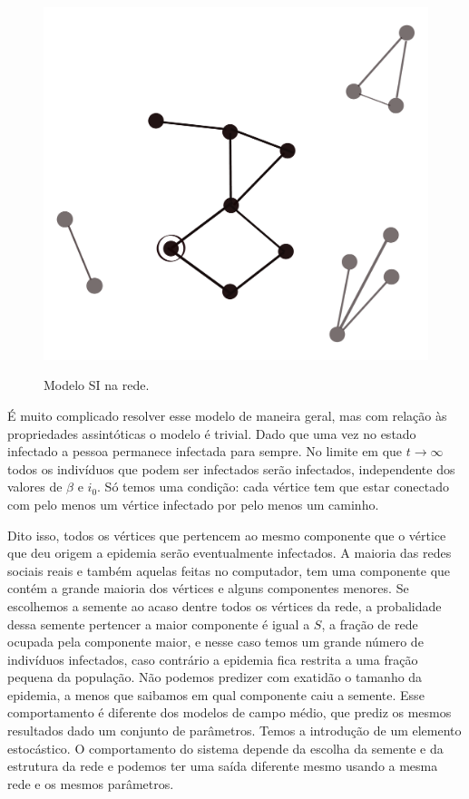 \documentclass[a4paper,11pt]{report}
\begin{document}
\begin{figure}[ht!]
\begin{center}
\includegraphics[scale=0.2]{./images/SI-model}
\label{fig:SI-model}
\caption{Modelo SI na rede.}
\end{center}
\end{figure}

\'E muito complicado resolver esse modelo de maneira geral, mas com rela\c{c}\~ao \`as propriedades assint\'oticas o modelo \'e trivial. Dado que uma vez no estado infectado a pessoa permanece infectada para sempre. No limite em que $t\to \infty$ todos os indiv\'iduos que podem ser infectados ser\~ao infectados, independente dos valores de $\beta$ e $i_0$. S\'o temos uma condi\c{c}\~ao: cada v\'ertice tem que estar conectado com pelo menos um v\'ertice infectado por pelo menos um caminho.  

Dito isso, todos os v\'ertices que pertencem ao mesmo componente que o v\'ertice que deu origem a epidemia ser\~ao eventualmente infectados. A maioria das redes sociais reais e tamb\'em aquelas feitas no computador, tem uma componente que cont\'em a grande maioria dos v\'ertices e alguns componentes menores. Se escolhemos a semente ao acaso dentre todos os v\'ertices da rede, a probalidade dessa semente pertencer a maior componente \'e igual a $S$, a fra\c{c}\~ao de rede ocupada pela componente maior, e nesse caso temos um grande n\'umero de indiv\'iduos infectados, caso contr\'ario a epidemia fica restrita a uma fra\c{c}\~ao pequena da popula\c{c}\~ao. N\~ao podemos predizer com exatid\~ao o tamanho da epidemia, a menos que saibamos em qual componente caiu a semente. Esse comportamento \'e diferente dos modelos de campo m\'edio, que prediz os mesmos resultados dado um conjunto de par\^ametros. Temos a introdu\c{c}\~ao de um elemento estoc\'astico. O comportamento do sistema depende da escolha da semente e da estrutura da rede e podemos ter uma sa\'ida diferente mesmo usando a mesma rede e os mesmos par\^ametros. 
\end{document}
